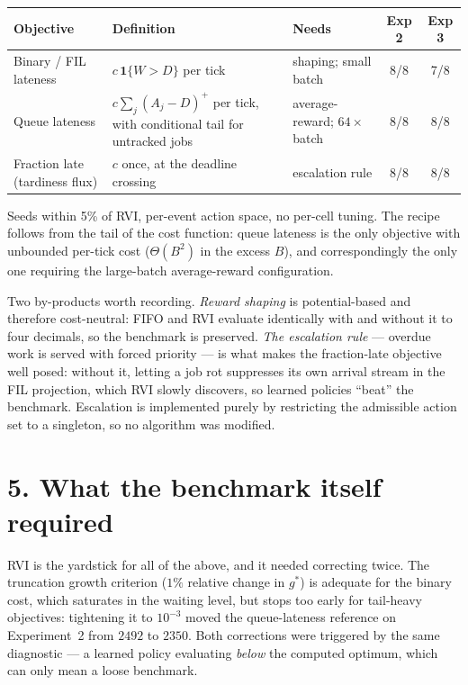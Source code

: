 \documentclass[11pt,a4paper]{article}
\begin{document}
\begin{center}
\begin{tabular}{p{3.0cm}p{5.4cm}p{3.4cm}cc}
\toprule
\textbf{Objective} & \textbf{Definition} & \textbf{Needs} & \textbf{Exp 2} & \textbf{Exp 3} \\
\midrule
Binary / FIL lateness & $c\,\mathbf{1}\{W>D\}$ per tick & shaping; small batch & 8/8 & 7/8 \\
Queue lateness & $c\sum_j (A_j-D)^+$ per tick, with conditional tail for
untracked jobs & average-reward; $64\times$ batch & 8/8 & 8/8 \\
Fraction late (tardiness flux) & $c$ once, at the deadline crossing & escalation
rule & 8/8 & 8/8 \\
\bottomrule
\end{tabular}
\end{center}

Seeds within 5\% of RVI, per-event action space, no per-cell tuning.  The
recipe follows from the tail of the cost function: queue lateness is the only
objective with unbounded per-tick cost ($\Theta(B^2)$ in the excess $B$), and
correspondingly the only one requiring the large-batch average-reward
configuration.

Two by-products worth recording.  \emph{Reward shaping} is potential-based and
therefore cost-neutral: FIFO and RVI evaluate identically with and without it to
four decimals, so the benchmark is preserved.  \emph{The escalation rule} ---
overdue work is served with forced priority --- is what makes the fraction-late
objective well posed: without it, letting a job rot suppresses its own arrival
stream in the FIL projection, which RVI slowly discovers, so learned policies
``beat'' the benchmark.  Escalation is implemented purely by restricting the
admissible action set to a singleton, so no algorithm was modified.

\section*{5. What the benchmark itself required}

RVI is the yardstick for all of the above, and it needed correcting twice.  The
truncation growth criterion ($1\%$ relative change in $g^*$) is adequate for the
binary cost, which saturates in the waiting level, but stops too early for
tail-heavy objectives: tightening it to $10^{-3}$ moved the queue-lateness
reference on Experiment~2 from $2492$ to $2350$.  Both corrections were
triggered by the same diagnostic --- a learned policy evaluating \emph{below} the
computed optimum, which can only mean a loose benchmark.
\end{document}

